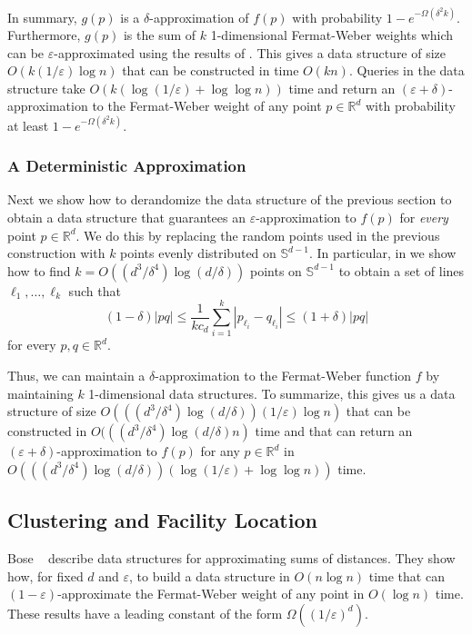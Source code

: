 \documentclass[charterfonts,lotsofwhite]{patmorin}
\newcommand{\eps}{\varepsilon}
\begin{document}
In summary, $g(p)$ is a $\delta$-approximation of $f(p)$ with
probability $1-e^{-\Omega(\delta^2k)}$.  Furthermore, $g(p)$ is the
sum of $k$ 1-dimensional Fermat-Weber weights which can be
$\eps$-approximated using the results of .  This gives a
data structure of size $O(k(1/\eps)\log n)$ that can be constructed in
time $O(kn)$.  Queries in the data structure take
$O(k(\log(1/\eps)+\log\log n))$ time and return an
$(\eps+\delta)$-approximation to the Fermat-Weber
weight of any point $p\in\mathbb{R}^d$ with probability at least
$1-e^{-\Omega(\delta^2k)}$. 

\subsubsection{A Deterministic Approximation}

Next we show how to derandomize the data structure of the previous
section to obtain a data structure that guarantees an
$\eps$-approximation to $f(p)$ for \emph{every} point
$p\in\mathbb{R}^d$.  We do this by replacing the random points used in
the previous construction with $k$ points evenly distributed on
$\mathbb{S}^{d-1}$.  In particular, in  we show how to
find $k=O((d^3/\delta^4)\log (d/\delta))$ points on $\mathbb{S}^{d-1}$
to obtain a set of lines $\ell_1,\ldots,\ell_k$ such that
\[
      (1-\delta)|pq|\le \frac{1}{kc_d} \sum_{i=1}^k |p_{\ell_i}-q_{\ell_i}| 
      \le (1+\delta)|pq| 
\]
for every $p,q\in\mathbb{R}^d$.

Thus, we can maintain a $\delta$-approximation to the Fermat-Weber
function $f$ by maintaining $k$ 1-dimensional data structures.  To
summarize, this gives us a data structure of size
$O(((d^3/\delta^{4})\log(d/\delta))(1/\eps)\log n)$ that can be constructed in
$O(((d^3/\delta^4)\log(d/\delta)n)$ time and that can return an
$(\eps+\delta)$-approximation to $f(p)$ for any $p\in\mathbb{R}^d$ in
$O(((d^3/\delta^{4})\log (d/\delta))(\log(1/\eps) + \log\log n))$ time.

\subsection{Clustering and Facility Location}

Bose \etal\ \cite{bmm02} describe data structures for approximating
sums of distances.  They show how, for fixed $d$ and $\eps$, to
build a data structure in $O(n\log n)$ time that can
$(1-\eps)$-approximate the Fermat-Weber weight of any point in $O(\log
n)$ time.  These results have a leading constant of the form
$\Omega((1/\eps)^d)$.
\end{document}
